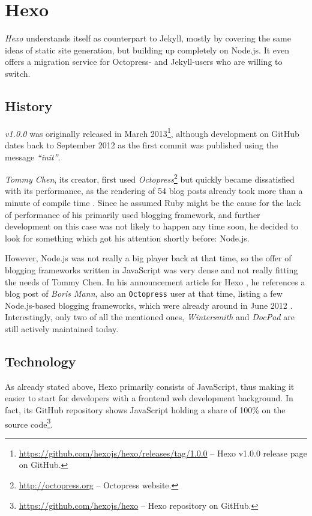 \section{Hexo}
\label{sec:hexo}

\emph{Hexo} understands itself as counterpart to Jekyll, mostly by covering the same ideas of static site generation, but building up completely on Node.js. It even offers a migration service for Octopress- and Jekyll-users who are willing to switch.

\subsection{History}
\label{sec:hexo-history}
\emph{v1.0.0} was originally released in March 2013\footnote{\url{https://github.com/hexojs/hexo/releases/tag/1.0.0} -- Hexo v1.0.0 release page on GitHub.}, although development on GitHub dates back to September 2012 as the first commit was published using the message \emph{``init''}.

\emph{Tommy Chen}, its creator, first used \emph{Octopress}\footnote{\url{http://octopress.org} -- Octopress website.} but quickly became dissatisfied with its performance, as the rendering of 54 blog posts already took more than a minute of compile time \cite{Chen2012hexodebut}. Since he assumed Ruby might be the cause for the lack of performance of his primarily used blogging framework, and further development on this case was not likely to happen any time soon, he decided to look for something which got his attention shortly before: Node.js.

However, Node.js was not really a big player back at that time, so the offer of blogging frameworks written in JavaScript was very dense and not really fitting the needs of Tommy Chen. In his announcement article for Hexo \cite{Chen2012hexodebut}, he references a blog post of \emph{Boris Mann}, also an \texttt{Octopress} user at that time, listing a few Node.js-based blogging frameworks, which were already around in June 2012 \cite{Mann2012nodestaticsite}. Interestingly, only two of all the mentioned ones, \emph{Wintersmith} and \emph{DocPad} are still actively maintained today.

\subsection{Technology}
\label{sec:hexo-technology}
As already stated above, Hexo primarily consists of JavaScript, thus making it easier to start for developers with a frontend web development background. In fact, its GitHub repository shows JavaScript holding a share of 100\% on the source code\footnote{\url{https://github.com/hexojs/hexo} -- Hexo repository on GitHub.}.

